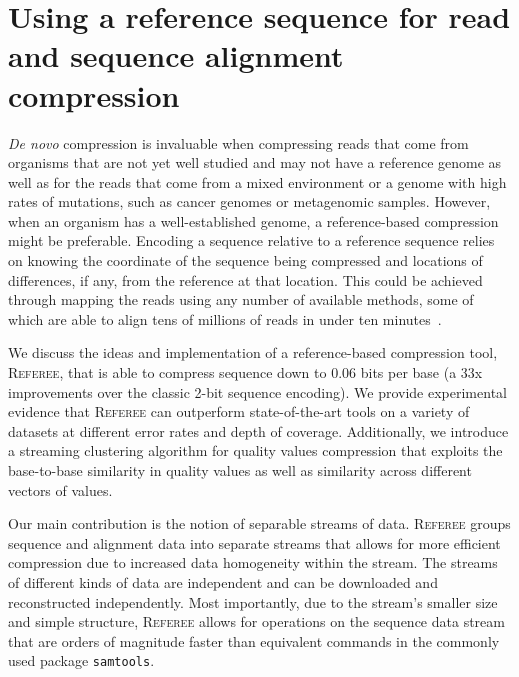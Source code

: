 \documentclass[12pt]{cmuthesis}
\newcommand{\refer}{\textsc{Referee}\xspace}
\begin{document}



\chapter{Using a reference sequence for read and sequence alignment compression}

\textit{De novo} compression is invaluable when compressing reads that come from organisms that are not yet well studied and may not have a reference genome as well as for the reads that come from a mixed environment or a genome with high rates of mutations, such as cancer genomes or metagenomic samples. However, when an organism has a well-established genome, a reference-based compression might be preferable. Encoding a sequence relative to a reference sequence relies on knowing the coordinate of the sequence being compressed and locations of differences, if any, from the reference at that location. This could be achieved through mapping the reads using any number of available methods, some of which are able to align tens of millions of reads in under ten minutes~\cite{DobinSTAR}. 


We discuss the ideas and implementation of a reference-based compression tool, \refer, that is able to compress sequence down to 0.06 bits per base (a 33x improvements over the classic 2-bit sequence encoding). We provide experimental evidence that \refer can outperform state-of-the-art tools on a variety of datasets at different error rates and depth of coverage. Additionally, we introduce a streaming clustering algorithm for quality values compression that exploits the base-to-base similarity in quality values as well as similarity across different vectors of values.


Our main contribution is the notion of separable streams of data. \refer groups sequence and alignment data into separate streams that allows for more efficient compression due to increased data homogeneity within the stream. The streams of different kinds of data are independent and can be downloaded and reconstructed independently. Most importantly, due to the stream's smaller size and simple structure, \refer allows for operations on the sequence data stream that are orders of magnitude faster than equivalent commands in the commonly used package \texttt{samtools}.
\end{document}
